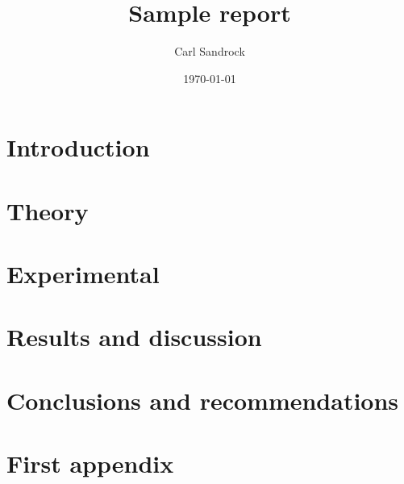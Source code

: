 \documentclass[a4paper,12pt]{article}
\title{Sample report}
\author{Carl Sandrock}
\date{\today}
\begin{document}


\section{Introduction} 


\section{Theory}


\section{Experimental}


\section{Results and discussion}
\label{sec:Results}


\section{Conclusions and recommendations}


\printbibliography
\appendix
\renewcommand{\thefigure}{\thesection.\arabic{figure}}
\renewcommand{\thetable}{\thesection.\arabic{table}}
\renewcommand{\thepage}{\thesection.\arabic{page}}

\section{First appendix}
\setcounter{figure}{0}
\setcounter{table}{0}
\setcounter{page}{1}

\end{document}
